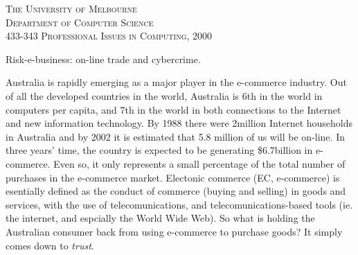 \documentclass[11pt,a4paper,twoside,notitlepage]{article}
\begin{document}
\begin{center}

\textsc{\large The University of Melbourne\\
	\large Department of Computer Science\\
	\large 433-343 Professional Issues in Computing, 2000\\}

\vspace{5cm}

{\huge Risk-e-business: on-line trade and cybercrime.}

\vspace{.5cm}

{\Large }

\date{\today}

\vspace{4cm}

\end{center}

\begin{abstract}

The Internet and E-commerce are revolutionising the way companies and consumers interact,
contradicting the precedents set by traditional business.  With enormous increases
in sales figures in the last three years, e-commerce is fast becoming one of the most
viable means to promote and conduct business.  However, a recent spate of security breaches
has highlighted the risks consumers face when shopping on-line.  Events like these
have raised a plethora of issues surrounding security.  New strategies and
technologies are being introduced to combat the problems of cybercrime, and minimise its
effect on the e-commerce industry.



\end{abstract}

\newpage

Australia is rapidly emerging as a major player in the e-commerce industry.
Out of all the developed countries in the world, Australia is 6th in the world in
computers per capita, and 7th in the world in both connections to the Internet
and new information technology\cite{WCY:wcy99}.  By 1988 there were 2million Internet households in Australia and by 2002 it is estimated that
5.8 million of us will be on-line.  In three years' time, the country is expected to be generating
\$6.7billion in e-commerce\cite{Horadam:Age99}.
Even so, it only represents a small percentage of the total number of purchases in 
the e-commerce market.
Electonic commerce (EC, e-commerce) is esentially defined as the conduct of commerce
(buying and selling) in goods and services, with the use of telecomunications, and 
telecomunications-based tools (ie. the internet, and espcially the World Wide Web)\cite{Clarke:url99}.
So what is holding the Australian consumer back from using e-commerce to purchase goods?
It simply comes down to \textit{trust}.
\end{document}
